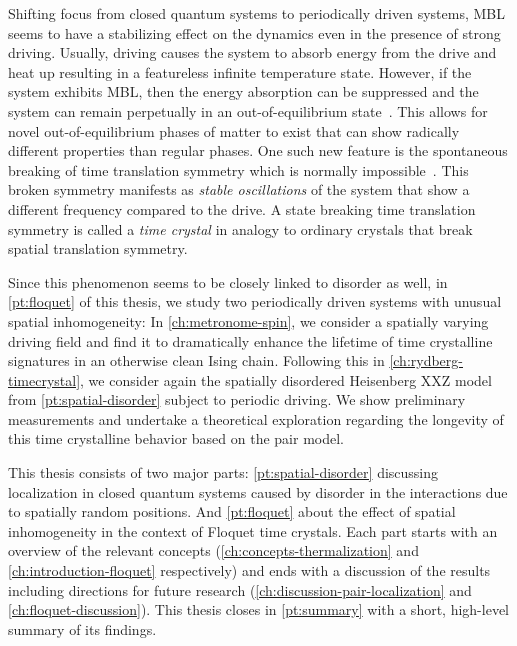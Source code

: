 Shifting focus from closed quantum systems to periodically driven systems, MBL seems to have a stabilizing effect on the dynamics even in the presence of strong driving. Usually, driving causes the system to absorb energy from the drive and heat up resulting in a featureless infinite temperature state. However, if the system exhibits MBL, then the energy absorption can be suppressed and the system can remain perpetually in an out-of-equilibrium state~\cite{abaninTheoryManybodyLocalization2016,elsePrethermalPhasesMatter2017,bordiaPeriodicallyDrivingManyBody2017,elseDiscreteTimeCrystals2020a}. This allows for novel out-of-equilibrium phases of matter to exist that can show radically different properties than regular phases. One such new feature is the spontaneous breaking of time translation symmetry which is normally impossible~\cite{watanabeAbsenceQuantumTime2015}. This broken symmetry manifests as \emph{stable oscillations} of the system that show a different frequency compared to the drive. A state breaking time translation symmetry is called a \emph{time crystal} in analogy to ordinary crystals that break spatial translation symmetry. 

Since this phenomenon seems to be closely linked to disorder as well, in \autoref{pt:floquet} of this thesis, we study two periodically driven systems with unusual spatial inhomogeneity: In \autoref{ch:metronome-spin}, we consider a spatially varying driving field and find it to dramatically enhance the lifetime of time crystalline signatures in an otherwise clean Ising chain. Following this in \autoref{ch:rydberg-timecrystal}, we consider again the spatially disordered Heisenberg XXZ model from \autoref{pt:spatial-disorder} subject to periodic driving. We show preliminary measurements and undertake a theoretical 
exploration regarding the longevity of this time crystalline behavior based on the pair model.

This thesis consists of two major parts: \autoref{pt:spatial-disorder} discussing localization in closed quantum systems caused by disorder in the interactions due to spatially random positions. And \autoref{pt:floquet} about the effect of spatial inhomogeneity in the context of Floquet time crystals.
Each part starts with an overview of the relevant concepts (\autoref{ch:concepts-thermalization} and \autoref{ch:introduction-floquet} respectively) and ends with a discussion of the results including directions for future research (\autoref{ch:discussion-pair-localization} and \autoref{ch:floquet-discussion}). This thesis closes in \autoref{pt:summary} with a short, high-level summary of its findings.